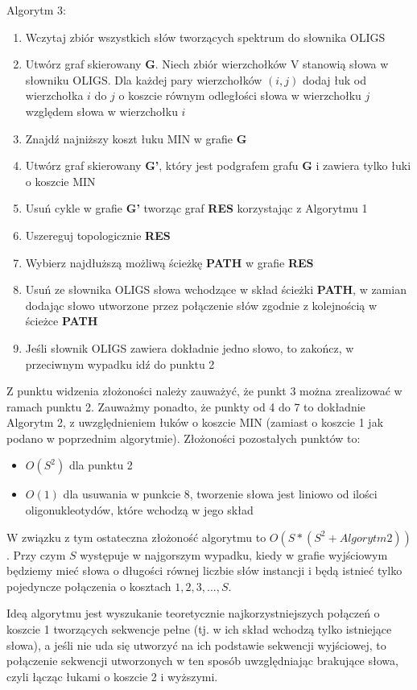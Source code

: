 \documentclass[a4paper,10pt]{article}
\begin{document}
Algorytm 3:
\begin{enumerate}
 \item Wczytaj zbiór wszystkich słów tworzących spektrum do słownika OLIGS
 \item Utwórz graf skierowany {\bf G}. Niech zbiór wierzchołków V stanowią słowa w słowniku OLIGS. Dla każdej pary wierzchołków $(i,j)$ dodaj łuk od wierzchołka $i$ do $j$ o koszcie równym odległości słowa w wierzchołku $j$ względem słowa w wierzchołku $i$
 \item Znajdź najniższy koszt łuku MIN w grafie {\bf G}
 \item Utwórz graf skierowany {\bf G'}, który jest podgrafem grafu {\bf G} i zawiera tylko łuki o koszcie MIN
 \item Usuń cykle w grafie {\bf G'} tworząc graf {\bf RES} korzystając z Algorytmu 1
 \item Uszereguj topologicznie {\bf RES}
 \item Wybierz najdłuższą możliwą ścieżkę {\bf PATH} w grafie {\bf RES}
 \item Usuń ze słownika OLIGS słowa wchodzące w skład ścieżki {\bf PATH}, w zamian dodając słowo utworzone przez połączenie słów zgodnie z kolejnością w ścieżce {\bf PATH}
 \item Jeśli słownik OLIGS zawiera dokładnie jedno słowo, to zakończ, w przeciwnym wypadku idź do punktu 2
\end{enumerate}

Z punktu widzenia złożoności należy zauważyć, że punkt 3 można zrealizować w ramach punktu 2. Zauważmy ponadto, że punkty od 4 do 7 to dokładnie Algorytm 2, z uwzględnieniem łuków o koszcie MIN (zamiast o koszcie 1 jak podano w poprzednim algorytmie). Złożoności pozostałych punktów to:
\begin{itemize}
 \item $O(S^2)$ dla punktu 2
 \item $O(1)$ dla usuwania w punkcie 8, tworzenie słowa jest liniowo od ilości oligonukleotydów, które wchodzą w jego skład
\end{itemize}
W związku z tym ostateczna złożoność algorytmu to $O(S * (S^2 + Algorytm2))$. Przy czym $S$ występuje w najgorszym wypadku, kiedy w grafie wyjściowym będziemy mieć słowa o długości równej liczbie słów instancji i będą istnieć tylko pojedyncze połączenia o kosztach $1, 2, 3, ..., S$.

Ideą algorytmu jest wyszukanie teoretycznie najkorzystniejszych połączeń o koszcie 1 tworzących sekwencje pełne (tj. w ich skład wchodzą tylko istniejące słowa), a jeśli nie uda się utworzyć na ich podstawie sekwencji wyjściowej, to połączenie sekwencji utworzonych w ten sposób uwzględniając brakujące słowa, czyli łącząc łukami o koszcie 2 i wyższymi. 
\end{document}
